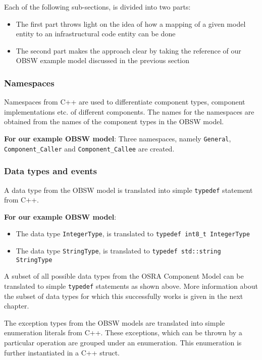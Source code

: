 Each of the following sub-sections, is divided into two parts:
\begin{itemize}
\item The first part throws light on the idea of how a mapping of a given model entity to an infrastructural code entity can be done
\item The second part makes the approach clear by taking the reference of our OBSW example model discussed in the previous section  
\end{itemize}

\subsubsection{\textbf{Namespaces}}
Namespaces from C++ are used to differentiate component types, component implementations etc. of different components. The names for the namespaces are obtained from the names of the component types in the OBSW model.

\textbf{For our example OBSW model}: Three namespaces, namely \texttt{General}, \texttt{Component\_Caller} and \texttt{Component\_Callee} are created. 

\subsubsection{\textbf{Data types and events}}
A data type from the OBSW model is translated into simple \texttt{typedef} statement from C++.

\textbf{For our example OBSW model}:
\begin{itemize}
\item The data type \texttt{IntegerType}, is translated to \texttt{typedef\allowbreak \ int8\_t IntegerType}
\item The data type \texttt{StringType}, is translated to \texttt{typedef\allowbreak \ std::string StringType} 
\end{itemize}

A subset of all possible data types from the OSRA Component Model can be translated to simple \texttt{typedef} statements as shown above. More information about the subset of data types for which this successfully works is given in the next chapter. 

The exception types from the OBSW models are translated into simple enumeration literals from C++. These exceptions, which can be thrown by a particular operation are grouped under an enumeration. This enumeration is further instantiated in a C++ struct.

